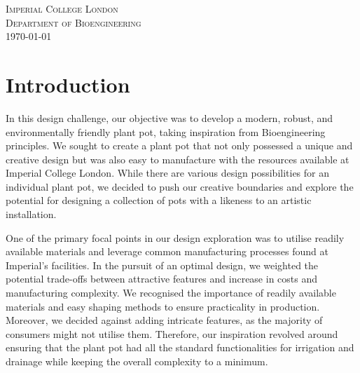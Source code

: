 \documentclass[12pt]{extarticle} %
\begin{document}
\begin{titlepage}

\begingroup
\let\newpage\relax%
\vspace*{\dimexpr-2em-\baselineskip}%
\maketitle
\endgroup
\thispagestyle{empty}
\center 
\textsc{\Large Imperial College London}\\[0.5cm] 
\textsc{\large Department of Bioengineering}\\[0.5cm] 
\large
\today
\tableofcontents
\end{titlepage}


\section{Introduction}
In this design challenge, our objective was to develop a modern, robust, and environmentally friendly plant pot, taking inspiration from Bioengineering principles. We sought to create a plant pot that not only possessed a unique and creative design but was also easy to manufacture with the resources available at Imperial College London. While there are various design possibilities for an individual plant pot, we decided to push our creative boundaries and explore the potential for designing a collection of pots with a likeness to an artistic installation.
 
One of the primary focal points in our design exploration was to utilise readily available materials and leverage common manufacturing processes found at Imperial's facilities. In the pursuit of an optimal design, we weighted the potential trade-offs between attractive features and increase in costs and manufacturing complexity. We recognised the importance of readily available materials and easy shaping methods to ensure practicality in production.  Moreover, we decided against adding intricate features, as the majority of consumers might not utilise them. Therefore, our inspiration revolved around ensuring that the plant pot had all the standard functionalities for irrigation and drainage while keeping the overall complexity to a minimum. 
\end{document}
